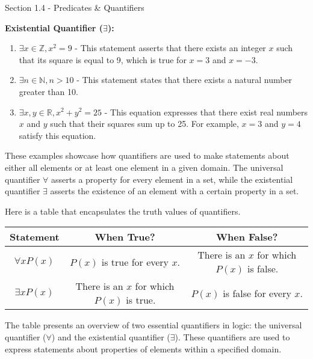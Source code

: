 \begin{notes}{Section 1.4 - Predicates \& Quantifiers}
\begin{Highlight}
        \textbf{Existential Quantifier (\(\exists\)):}
        \begin{enumerate}
            \item \(\exists x \in \mathbb{Z}, x^2 = 9\) - This statement asserts that there exists an integer \(x\) such that its square is equal to 9, which is true for \(x = 3\) and \(x = -3\).
            \item \(\exists n \in \mathbb{N}, n > 10\) - This statement states that there exists a natural number greater than 10.
            \item \(\exists x, y \in \mathbb{R}, x^2 + y^2 = 25\) - This equation expresses that there exist real numbers \(x\) and \(y\) such that their squares sum up to 25. For example, \(x = 3\) and \(y = 4\) satisfy this equation.
        \end{enumerate}
        These examples showcase how quantifiers are used to make statements about either all elements or at least one element in a given domain. The universal quantifier \(\forall\) asserts a property for every element in a set, while the existential 
        quantifier \(\exists\) asserts the existence of an element with a certain property in a set.
    \end{Highlight}

    Here is a table that encapsulates the truth values of quantifiers.

    \begin{center}
        \begin{tabular}{|c|c|c|}
            \hline \textbf{Statement} & \textbf{When True?} & \textbf{When False?} \\ \hline
            \(\forall x P(x)\) & \(P(x)\) is true for every \(x\). & There is an \(x\) for which \(P(x)\) is false. \\ \hline
            \(\exists x P(x)\) & There is an \(x\) for which \(P(x)\) is true. & \(P(x)\) is false for every \(x\). \\ \hline
        \end{tabular}
    \end{center}

    The table presents an overview of two essential quantifiers in logic: the universal quantifier (\(\forall\)) and the existential quantifier (\(\exists\)). These quantifiers are used to express statements about properties of elements within a 
    specified domain. 
    

\end{notes}
